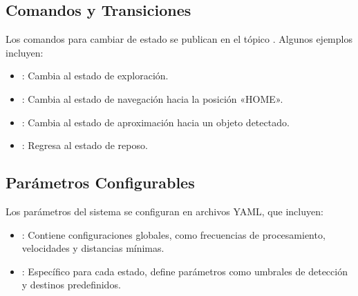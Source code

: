 \documentclass[a4paper,10pt,spanish]{sphinxmanual}
\begin{document}
\subsection{Comandos y Transiciones}
\label{\detokenize{uso:comandos-y-transiciones}}
\sphinxAtStartPar
Los comandos para cambiar de estado se publican en el tópico . Algunos ejemplos incluyen:
\begin{itemize}
\item {} 
\sphinxAtStartPar
{}: Cambia al estado de exploración.

\item {} 
\sphinxAtStartPar
{}: Cambia al estado de navegación hacia la posición «HOME».

\item {} 
\sphinxAtStartPar
{}: Cambia al estado de aproximación hacia un objeto detectado.

\item {} 
\sphinxAtStartPar
{}: Regresa al estado de reposo.

\end{itemize}


\subsection{Parámetros Configurables}
\label{\detokenize{uso:parametros-configurables}}
\sphinxAtStartPar
Los parámetros del sistema se configuran en archivos YAML, que incluyen:
\begin{itemize}
\item {} 
\sphinxAtStartPar
{}:
Contiene configuraciones globales, como frecuencias de procesamiento, velocidades y distancias mínimas.

\item {} 
\sphinxAtStartPar
{}:
Específico para cada estado, define parámetros como umbrales de detección y destinos predefinidos.

\end{itemize}
\end{document}

